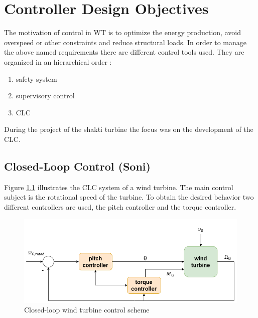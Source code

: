 \chapter{Controller Design Objectives}
The motivation of control in \gls{WT} is to optimize the energy production, avoid overspeed or other constraints and reduce structural loads. \cite{SchlipfLecture}
In order to manage the above named requirements there are different control tools used.
They are organized in an hierarchical order \cite{WindEnergyHandbook}:
\begin{enumerate} 
	\item safety system
	\item supervisory control
	\item \gls{CLC}
\end{enumerate} 
During the project of the \gls{shakti} turbine the focus was on the development of the \gls{CLC}.
\section{Closed-Loop Control (Soni)} \label{Advanced controller}
Figure \ref{fig:Closed-loop Wind Turbine Control} illustrates the \gls{CLC} system of a wind turbine.
The main control subject is the rotational speed of the turbine.
To obtain the desired behavior two different controllers are used, the pitch controller and the torque controller.

\begin{figure}[h]
	\centering
	\includegraphics[width=\textwidth]{Figures/Figure_1.png}
	\caption{Closed-loop wind turbine control scheme}
	\label{fig:Closed-loop Wind Turbine Control}
\end{figure}

